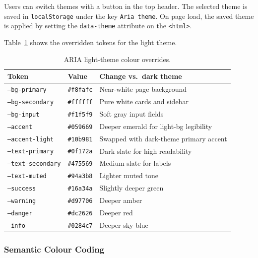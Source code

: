 \vspace{0.5em}

Users can switch themes with a button in the top header. 
The selected theme is saved in \texttt{localStorage} under the key \texttt{Aria theme}. 
On page load, the saved theme is applied by setting the \texttt{data-theme} attribute on the \texttt{<html>}.


Table~\ref{tab:palette-light} shows the overridden tokens for the light theme.

\begin{table}[H]
\centering
\caption{ARIA light-theme colour overrides.}
\label{tab:palette-light}
\small
\renewcommand{\arraystretch}{1.4}
\begin{tabular}{@{}llp{6.8cm}@{}}
\toprule
\textbf{Token} & \textbf{Value} & \textbf{Change vs.\ dark theme} \\
\midrule
\texttt{--bg-primary}     & \texttt{\#f8fafc} & Near-white page background \\
\texttt{--bg-secondary}   & \texttt{\#ffffff} & Pure white cards and sidebar \\
\texttt{--bg-input}       & \texttt{\#f1f5f9} & Soft gray input fields \\
\texttt{--accent}         & \texttt{\#059669} & Deeper emerald for light-bg legibility \\
\texttt{--accent-light}   & \texttt{\#10b981} & Swapped with dark-theme primary accent \\
\texttt{--text-primary}   & \texttt{\#0f172a} & Dark slate for high readability \\
\texttt{--text-secondary} & \texttt{\#475569} & Medium slate for labels \\
\texttt{--text-muted}     & \texttt{\#94a3b8} & Lighter muted tone \\
\texttt{--success}        & \texttt{\#16a34a} & Slightly deeper green \\
\texttt{--warning}        & \texttt{\#d97706} & Deeper amber \\
\texttt{--danger}         & \texttt{\#dc2626} & Deeper red \\
\texttt{--info}           & \texttt{\#0284c7} & Deeper sky blue \\
\bottomrule
\end{tabular}
\end{table}

\subsubsection{Semantic Colour Coding}

